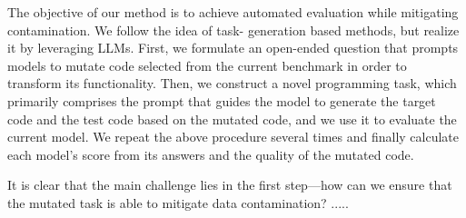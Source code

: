  The objective of our method is to achieve automated evaluation while mitigating contamination. We follow the idea of task- generation based methods, but realize it by leveraging LLMs. First, we formulate an open-ended question that prompts models to mutate code selected from the current benchmark in order to transform its functionality. Then, we construct a novel programming task, which primarily comprises the prompt that guides the model to generate the target code and the test code based on the mutated code, and we use it to evaluate the current model. We repeat the above procedure several times and finally calculate each model's score from its answers and the quality of the mutated code.


It is clear that the main challenge lies in the first step---how can we ensure that the mutated task is able to mitigate data contamination? .....


\label{sec:intro}
